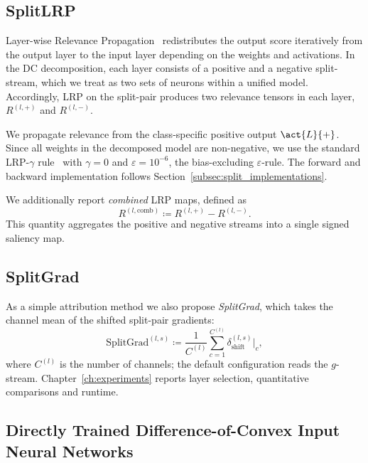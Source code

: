 \subsection{SplitLRP}\label{sec:split_lrp}

Layer-wise Relevance Propagation~\parencite{Bach2015} redistributes the output score iteratively from the output layer to the input layer depending on the weights and activations. In the DC decomposition, each layer consists of a positive and a negative split-stream, which we treat as two sets of neurons within a unified model. Accordingly, LRP on the split-pair produces two relevance tensors in each layer, $R^{(l,+)}$ and $R^{(l,-)}$.

We propagate relevance from the class-specific positive output $\act{L}{+}$. Since all weights in the decomposed model are non-negative, we use the standard LRP-$\gamma$ rule~\parencite{Montavon_2022_gammaLRP} with $\gamma=0$ and $\varepsilon=10^{-6}$, the bias-excluding $\varepsilon$-rule. The forward and backward implementation follows Section~\ref{subsec:split_implementations}.

We additionally report \emph{combined} LRP maps, defined as
\begin{equation}
R^{(l,\mathrm{comb})}\coloneqq R^{(l,+)}-R^{(l,-)}.
\label{eq:splitlrp_combined}
\end{equation}
This quantity aggregates the positive and negative streams into a single signed saliency map.

\subsection{SplitGrad}\label{sec:split_grad}

As a simple attribution method we also propose \emph{SplitGrad}, which takes the channel mean of the shifted split-pair gradients:
\begin{equation}
\text{SplitGrad}^{(l,s)}\coloneqq\frac{1}{C^{(l)}}\sum_{c=1}^{C^{(l)}}\delta_{\mathrm{shift}}^{(l,s)}\big\vert_c,
\label{eq:splitgrad}
\end{equation}
where $C^{(l)}$ is the number of channels; the default configuration reads the $g$-stream. Chapter~\ref{ch:experiments} reports layer selection, quantitative comparisons and runtime.

\subsection{Directly Trained Difference-of-Convex Input Neural Networks}\label{sec:dcinns}

